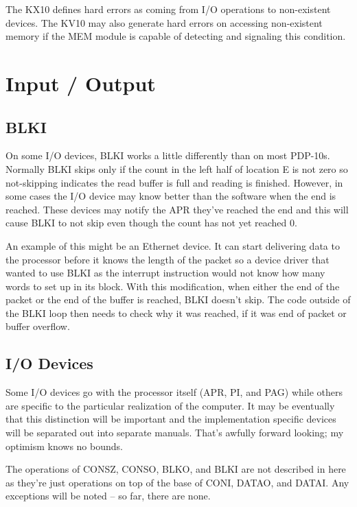 \documentclass[12pt]{report}
\newcommand{\code}[1]{\textsf{#1}}
\begin{document}
The KX10 defines hard errors as coming from I/O operations to non-existent devices.  The
KV10 may also generate hard errors on accessing non-existent memory if the MEM module is
capable of detecting and signaling this condition.

\chapter{Input / Output}

\section{BLKI}

On some I/O devices, \code{BLKI} works a little differently than on most PDP-10s.  Normally
\code{BLKI} skips only if the count in the left half of location \code{E} is not zero so
not-skipping indicates the read buffer is full and reading is finished.  However, in some
cases the I/O device may know better than the software when the end is reached.  These
devices may notify the APR they've reached the end and this will cause \code{BLKI} to not
skip even though the count has not yet reached 0.

An example of this might be an Ethernet device.  It can start delivering data to the
processor before it knows the length of the packet so a device driver that wanted to use
\code{BLKI} as the interrupt instruction would not know how many words to set up in its
block.  With this modification, when either the end of the packet or the end of the buffer
is reached, \code{BLKI} doesn't skip.  The code outside of the \code{BLKI} loop then needs
to check why it was reached, if it was end of packet or buffer overflow.

\section{I/O Devices}

Some I/O devices go with the processor itself (APR, PI, and PAG) while others are specific
to the particular realization of the computer.  It may be eventually that this distinction
will be important and the implementation specific devices will be separated out into
separate manuals.  That's awfully forward looking; my optimism knows no bounds.

The operations of \code{CONSZ}, \code{CONSO}, \code{BLKO}, and \code{BLKI} are not
described in here as they're just operations on top of the base of \code{CONI},
\code{DATAO}, and \code{DATAI}.  Any exceptions will be noted -- so far, there are none.
\end{document}
